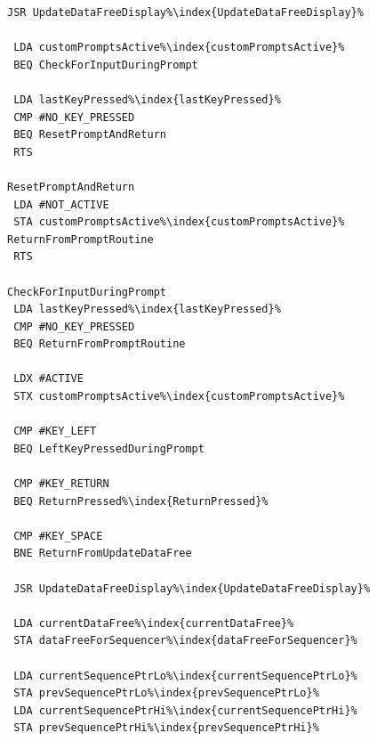 \begin{minipage}[b]{0.33\linewidth}
\begin{lrbox}{\mybox}
\begin{lstlisting}[basicstyle=\ttfamily\tiny,escapechar=\%]
 JSR UpdateDataFreeDisplay%\index{UpdateDataFreeDisplay}%

 LDA customPromptsActive%\index{customPromptsActive}%
 BEQ CheckForInputDuringPrompt

 LDA lastKeyPressed%\index{lastKeyPressed}%
 CMP #NO_KEY_PRESSED
 BEQ ResetPromptAndReturn
 RTS

ResetPromptAndReturn
 LDA #NOT_ACTIVE
 STA customPromptsActive%\index{customPromptsActive}%
ReturnFromPromptRoutine
 RTS

CheckForInputDuringPrompt
 LDA lastKeyPressed%\index{lastKeyPressed}%
 CMP #NO_KEY_PRESSED
 BEQ ReturnFromPromptRoutine

 LDX #ACTIVE
 STX customPromptsActive%\index{customPromptsActive}%

 CMP #KEY_LEFT
 BEQ LeftKeyPressedDuringPrompt

 CMP #KEY_RETURN
 BEQ ReturnPressed%\index{ReturnPressed}%

 CMP #KEY_SPACE
 BNE ReturnFromUpdateDataFree

 JSR UpdateDataFreeDisplay%\index{UpdateDataFreeDisplay}%

 LDA currentDataFree%\index{currentDataFree}%
 STA dataFreeForSequencer%\index{dataFreeForSequencer}%

 LDA currentSequencePtrLo%\index{currentSequencePtrLo}%
 STA prevSequencePtrLo%\index{prevSequencePtrLo}%
 LDA currentSequencePtrHi%\index{currentSequencePtrHi}%
 STA prevSequencePtrHi%\index{prevSequencePtrHi}%

\end{lstlisting}
\end{lrbox}%
\scalebox{0.8}{\usebox{\mybox}}
\end{minipage}
